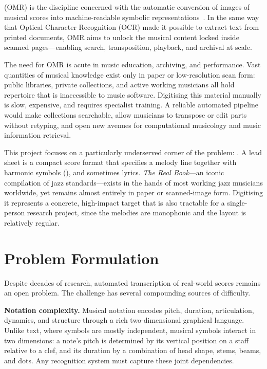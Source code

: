 \documentclass[11pt, a4paper]{report}
\begin{document}
 (OMR) is the discipline concerned with the automatic conversion of images of musical scores into machine-readable symbolic representations~\cite{shatriOPTICALMUSICRECOGNITION}. In the same way that Optical Character Recognition (OCR) made it possible to extract text from printed documents, OMR aims to unlock the musical content locked inside scanned pages---enabling search, transposition, playback, and archival at scale.

The need for OMR is acute in music education, archiving, and performance. Vast quantities of musical knowledge exist only in paper or low-resolution scan form: public libraries, private collections, and active working musicians all hold repertoire that is inaccessible to music software. Digitising this material manually is slow, expensive, and requires specialist training. A reliable automated pipeline would make collections searchable, allow musicians to transpose or edit parts without retyping, and open new avenues for computational musicology and music information retrieval.

This project focuses on a particularly underserved corner of the problem: . A lead sheet is a compact score format that specifies a melody line together with harmonic symbols (), and sometimes lyrics. \textit{The Real Book}---an iconic compilation of jazz standards---exists in the hands of most working jazz musicians worldwide, yet remains almost entirely in paper or scanned-image form. Digitising it represents a concrete, high-impact target that is also tractable for a single-person research project, since the melodies are monophonic and the layout is relatively regular.

\section{Problem Formulation}

Despite decades of research, automated transcription of real-world scores remains an open problem. The challenge has several compounding sources of difficulty.

\textbf{Notation complexity.} Musical notation encodes pitch, duration, articulation, dynamics, and structure through a rich two-dimensional graphical language. Unlike text, where symbols are mostly independent, musical symbols interact in two dimensions: a note's pitch is determined by its vertical position on a staff relative to a clef, and its duration by a combination of head shape, stems, beams, and dots. Any recognition system must capture these joint dependencies.
\end{document}
